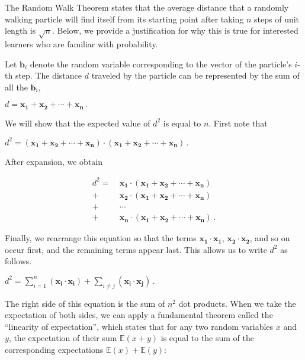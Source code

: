 \documentclass{article}
\begin{document}
The Random Walk Theorem states that the average distance that a randomly walking particle will find itself from its starting point after taking $n$ steps of unit length is $\sqrt{n}$. Below, we provide a justification for why this is true for interested learners who are familiar with probability.

Let $\mathbf{b}_i$ denote the random variable corresponding to the vector of the particle's $i$-th step.  The distance $d$ traveled by the particle can be represented by the sum of all the $\mathbf{b}_i$,

\begin{center}
$d = \mathbf{x_1} + \mathbf{x_2} + \cdots + \mathbf{x_n} \,.$
\end{center}

We will show that the expected value of $d^2$ is equal to $n$. First note that

\begin{center}
$d^2 = (\mathbf{x_1} + \mathbf{x_2} + \cdots + \mathbf{x_n}) \cdot (\mathbf{x_1} + \mathbf{x_2} + \cdots + \mathbf{x_n})\,.$
\end{center}

\noindent After expansion, we obtain
\begin{center}
\begin{align*}
d^2 = ~ & \mathbf{x_1} \cdot (\mathbf{x_1} + \mathbf{x_2} + \cdots + \mathbf{x_n})\\
+ & \mathbf{x_2} \cdot (\mathbf{x_1} + \mathbf{x_2} + \cdots + \mathbf{x_n})\\
+ & \cdots\\
+ & \mathbf{x_n} \cdot (\mathbf{x_1} + \mathbf{x_2} + \cdots + \mathbf{x_n}) \,.
\end{align*}
\end{center}

Finally, we rearrange this equation so that the terms $\mathbf{x_1} \cdot \mathbf{x_1}$, $\mathbf{x_2} \cdot \mathbf{x_2}$, and so on occur first, and the remaining terms appear last. This allows us to write $d^2$ as follows.

\begin{center}
$d^2 = \sum_{i=1}^n (\mathbf{x_i} \cdot \mathbf{x_i}) + \sum_{i \neq j} (\mathbf{x_i} \cdot \mathbf{x_j})\, .$
\end{center}

The right side of this equation is the sum of $n^2$ dot products.  When we take the expectation of both sides, we can apply a fundamental theorem called the ``linearity of expectation'', which states that for any two random variables $x$ and $y$, the expectation of their sum $\mathbb{E}(x + y)$ is equal to the sum of the corresponding expectations $\mathbb{E}(x) + \mathbb{E}(y)$:
\end{document}

